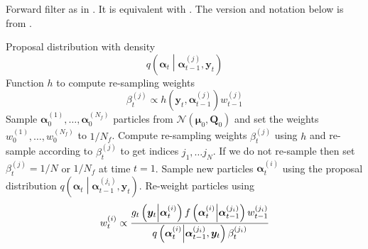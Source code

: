 \documentclass[notitlepage]{article}
\newcommand\StateX{\Statex\hspace{\algorithmicindent}}
\renewcommand{\vec}[1]{\bm{#1}}
\newcommand{\mat}[1]{\mathbf{#1}}
\newcommand{\Lparen}[1]{\left( #1\right)}
\newcommand{\Cond}[2]{ #1 \middle\vert  #2}
\newcommand{\optor}[2]{#1\Lparen{#2}}
\newcommand{\optorC}[3]{\optor{#1}{\Cond{#2}{#3}}}
\newcommand{\gFunc}[3]{\optorC{g_{#3}}{#1}{#2}}
\newcommand{\fFunc}[2]{\optorC{f}{#1}{#2}}
\newcommand{\normal}[2]{\optor{\mathcal{N}}{#1,#2}}
\newcommand{\IDC}[2]{\optorC{q}{#1}{#2}}
\newcommand{\partic}[3]{#1_{#2}^{\Lparen{#3}}}
\newcommand{\nPart}{N}
\newcommand{\nPeriods}{d}
\begin{document}
\begin{algorithm}[H]
\caption{Forward filter as in \cite{pitt99}. It is equivalent with \citet[page 20 and 25]{doucet09}. The version and notation below is from \citet[page 449]{fearnhead10}.}\label{alg:forward}
\begin{algorithmic}[1]\raggedright
\INPUT
\Statex Proposal distribution with density 
\Statex $$
\IDC{\vec{\alpha}_t}{\partic{\vec{\alpha}}{t-1}{j}, \vec{y}_t}
$$
\Statex Function $h$ to compute re-sampling weights 
$$
	\partic{\beta}{t}{j} \propto h(\vec{y}_t,\partic{\vec{\alpha}}{t-1}{j})\partic{w}{t-1}{j}
$$
\State Sample $\partic{\vec{\alpha}}{0}{1},\dots,\partic{\vec{\alpha}}{0}{\nPart_f}$ particles from $\normal{\vec\mu_0}{\mat{Q}_0}$ and set the weights $\partic{w}{0}{1},\dots,\partic{w}{0}{\nPart_f}$ to $1 / \nPart_f$.
%
\For{$t=1,\dots, \nPeriods$}
\State Compute re-sampling weights $\partic{\beta}{t}{j}$ using $h$ and re-sample 
according to $\partic{\beta}{t}{j}$ to get indices $j_1,\dots j_\nPart$. If we do not 
re-sample then set $\partic{\beta}{t}{j} = 1 / \nPart$ or $1/ \nPart_f$ at time $t = 1$.
\EndProcedure
%
\State Sample new particles $\partic{\vec{\alpha}}{t}{i}$ using the proposal distribution $\IDC{\vec{\alpha}_t}{\partic{\vec{\alpha}}{t-1}{j_i}, \vec{y}_t}$.
\EndProcedure
%
\State Re-weight particles using 
\StateX \begin{equation}\label{eqn:forwardWeight}
	\partic{w}{t}{i} \propto \frac{
		\gFunc{\vec{y}_t}{\partic{\vec{\alpha}}{t}{i}}{t}
		\fFunc{\partic{\vec{\alpha}}{t}{i}}{\partic{\vec{\alpha}}{t-1}{j_i}}
		\partic{w}{t-1}{j_i}
	}{ %
		\IDC{\partic{\vec{\alpha}}{t}{i}}{\partic{\vec{\alpha}}{t-1}{j_i}, \vec{y}_t}
		\partic{\beta}{t}{j_i}
	}
\end{equation}
\EndProcedure
\EndFor
\end{algorithmic}
\end{algorithm}
\end{document}
